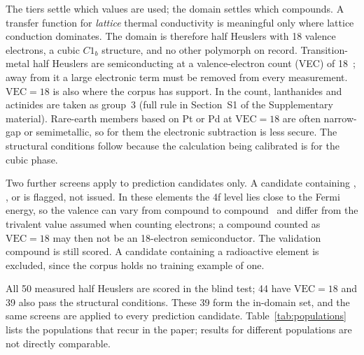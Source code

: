 The tiers settle which values are used; the domain settles which compounds. A transfer function for
\emph{lattice} thermal conductivity is meaningful only where lattice conduction dominates. The domain is therefore half Heuslers with 18 valence electrons, a cubic
$C1_b$ structure, and no other polymorph on record. Transition-metal half Heuslers are
semiconducting at a valence-electron count (VEC) of 18~\cite{graf2011simple}; away from it a large
electronic term must be removed from every measurement. $\mathrm{VEC}=18$ is also where the corpus
has support. In the count, lanthanides and actinides are taken as group~3 (full rule in Section~S1 of the Supplementary material). Rare-earth members based on Pt or Pd at $\mathrm{VEC}=18$ are often
narrow-gap or semimetallic, so for them the electronic subtraction is less secure. The structural
conditions follow because the calculation being calibrated is for the cubic phase.

Two further screens apply to prediction candidates only. A candidate containing , ,
 or  is flagged, not issued. In these elements the 4f level lies close to the Fermi
energy, so the valence can vary from compound to compound~\cite{lawrence1981valence} and differ from
the trivalent value assumed when counting electrons; a compound counted as $\mathrm{VEC}=18$ may
then not be an 18-electron semiconductor. The validation compound  is still scored. A
candidate containing a radioactive element is excluded, since the corpus holds no training example
of one.

All \num{50} measured half Heuslers are scored in the blind test; \num{44} have $\mathrm{VEC}=18$
and \num{39} also pass the structural conditions. These \num{39} form the in-domain set, and the
same screens are applied to every prediction candidate. Table~\ref{tab:populations} lists the
populations that recur in the paper; results for different populations are not directly comparable.

